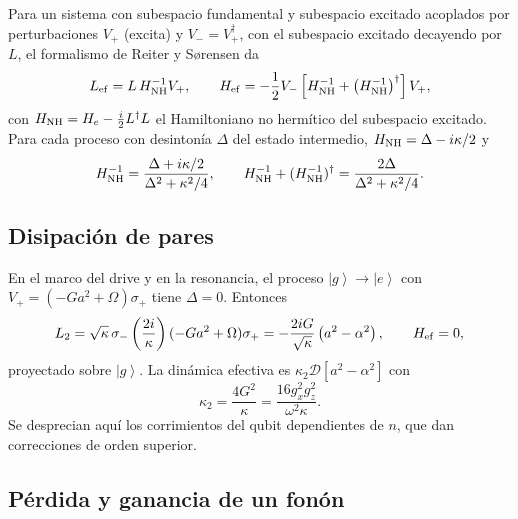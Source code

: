 \documentclass[11pt]{report}
\newcommand{\ket}[1]{\left|#1\right\rangle}
\newcommand{\spl}{\sigma_{+}}
\newcommand{\smi}{\sigma_{-}}
\newcommand{\D}{\mathcal{D}}
\begin{document}
Para un sistema con subespacio fundamental y subespacio excitado acoplados por perturbaciones $V_{+}$ (excita) y $V_{-}=V_{+}^{\dagger}$, con el subespacio excitado decayendo por $L$, el formalismo de Reiter y S{\o}rensen \cite{ReiterSorensen2012} da
\begin{equation}
L_{\rm ef}=L\,H_{\rm NH}^{-1}V_{+},\qquad H_{\rm ef}=-\frac{1}{2}V_{-}\left[H_{\rm NH}^{-1}+\left(H_{\rm NH}^{-1}\right)^{\dagger}\right]V_{+},
\end{equation}
con $H_{\rm NH}=H_{e}-\tfrac{i}{2}L^{\dagger}L$ el Hamiltoniano no herm\'itico del subespacio excitado. Para cada proceso con desinton\'ia $\Delta$ del estado intermedio, $H_{\rm NH}=\Delta-i\kappa/2$ y
\begin{equation}
H_{\rm NH}^{-1}=\frac{\Delta+i\kappa/2}{\Delta^{2}+\kappa^{2}/4},\qquad H_{\rm NH}^{-1}+(H_{\rm NH}^{-1})^{\dagger}=\frac{2\Delta}{\Delta^{2}+\kappa^{2}/4}.
\end{equation}

\subsection{Disipaci\'on de pares}

En el marco del drive y en la resonancia, el proceso $\ket{g}\to\ket{e}$ con $V_{+}=(-Ga^{2}+\Omega)\spl$ tiene $\Delta=0$. Entonces
\begin{equation}
L_{2}=\sqrt\kappa\,\smi\left(\frac{2i}{\kappa}\right)(-Ga^{2}+\Omega)\spl=-\frac{2iG}{\sqrt\kappa}\left(a^{2}-\alpha^{2}\right),\qquad H_{\rm ef}=0,
\end{equation}
proyectado sobre $\ket{g}$. La din\'amica efectiva es $\kappa_{2}\D[a^{2}-\alpha^{2}]$ con
\begin{equation}
\boxed{\kappa_{2}=\frac{4G^{2}}{\kappa}=\frac{16g_{x}^{2}g_{z}^{2}}{\omega^{2}\kappa}}.
\end{equation}
Se desprecian aqu\'i los corrimientos del qubit dependientes de $n$, que dan correcciones de orden superior.

\subsection{P\'erdida y ganancia de un fon\'on}
\end{document}
